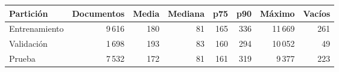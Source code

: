 \begin{tabular}{lrrrrrrr}
\toprule
Partición & Documentos & Media & Mediana & p75 & p90 & Máximo & Vacíos \\
\midrule
Entrenamiento & 9\,616 & 180 & 81 & 165 & 336 & 11\,669 & 261 \\
Validación & 1\,698 & 193 & 83 & 160 & 294 & 10\,052 & 49 \\
Prueba & 7\,532 & 172 & 81 & 161 & 319 & 9\,377 & 223 \\
\bottomrule
\end{tabular}
